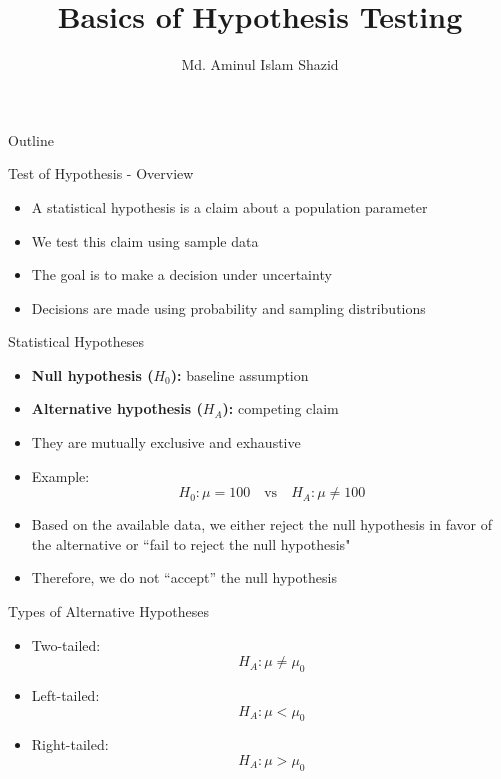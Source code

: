 \documentclass[12pt, aspectratio=169]{beamer}
\title{Basics of Hypothesis Testing}
\author{Md. Aminul Islam Shazid}
\date{}
\begin{document}
    {
		\addtocounter{framenumber}{-2}    %

		\begin{frame}
			\titlepage
		\end{frame}

		\begin{frame}{Outline}
            \vfill
			\tableofcontents[subsectionstyle=hide]
            \vfill
		\end{frame}
	}


    \begin{frame}{Test of Hypothesis - Overview}
        \begin{itemize}
            \item A statistical hypothesis is a claim about a population parameter
            \item We test this claim using sample data
            \item The goal is to make a decision under uncertainty
            \item Decisions are made using probability and sampling distributions
        \end{itemize}
    \end{frame}


    \begin{frame}{Statistical Hypotheses}
        \begin{itemize}
            \item \textbf{Null hypothesis ($H_0$):} baseline assumption
            \item \textbf{Alternative hypothesis ($H_A$):} competing claim
            \item They are mutually exclusive and exhaustive
            \item Example:
            \[
            H_0: \mu = 100 \quad \text{vs} \quad H_A: \mu \neq 100
            \]
            \item Based on the available data, we either reject the null hypothesis in favor of the alternative or ``fail to reject the null hypothesis"
            \item Therefore, we do not ``accept'' the null hypothesis
        \end{itemize}
    \end{frame}
    

    \begin{frame}{Types of Alternative Hypotheses}
        \begin{itemize}
            \item Two-tailed:
            \[
            H_A: \mu \neq \mu_0
            \]
            \item Left-tailed:
            \[
            H_A: \mu < \mu_0
            \]
            \item Right-tailed:
            \[
            H_A: \mu > \mu_0
            \]
        \end{itemize}
    \end{frame}
\end{document}
